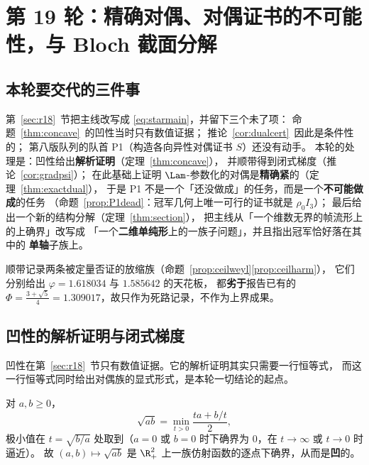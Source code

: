 \section{第 19 轮：精确对偶、对偶证书的不可能性，与 Bloch 截面分解}\label{sec:r19}

\subsection{本轮要交代的三件事}\label{sec:r19:motiv}

第~\ref{sec:r18}~节把主线改写成 \eqref{eq:starmain}，并留下三个未了项：
命题~\ref{thm:concave}~的凹性当时只有数值证据；
推论~\ref{cor:dualcert}~因此是条件性的；
第八版队列的队首 P1（构造各向异性对偶证书 $S$）还没有动手。
本轮的处理是：凹性给出\textbf{解析证明}（定理~\ref{thm:concave}），
并顺带得到闭式梯度（推论~\ref{cor:gradpsi}）；
在此基础上证明 $\Lam$-参数化的对偶是\textbf{精确紧}的（定理~\ref{thm:exactdual}），
于是 P1 不是一个「还没做成」的任务，而是一个\textbf{不可能做成}的任务
（命题~\ref{prop:P1dead}：冠军几何上唯一可行的证书就是 $\rho_0I_3$）；
最后给出一个新的结构分解（定理~\ref{thm:section}），
把主线从「一个维数无界的帧流形上的上确界」改写成
「一个\textbf{二维单纯形}上的一族子问题」，并且指出冠军恰好落在其中的
\textbf{单轴}子族上。

顺带记录两条被定量否证的放缩族（命题~\ref{prop:ceilweyl}\ref{prop:ceilharm}），
它们分别给出 $\varphi=1.618034$ 与 $1.585642$ 的天花板，
都\textbf{劣于}报告已有的 $\Phi=\frac{3+\sqrt5}4=1.309017$，故只作为死路记录，不作为上界成果。

\subsection{凹性的解析证明与闭式梯度}\label{sec:r19:conc}

凹性在第~\ref{sec:r18}~节只有数值证据。它的解析证明其实只需要一行恒等式，
而这一行恒等式同时给出对偶族的显式形式，是本轮一切结论的起点。

\begin{lemma}[几何平均的仿射下确界表示]\label{lem:geo}
对 $a,b\ge0$，
\begin{equation}\label{eq:geoam}
\sqrt{ab}=\min_{t>0}\frac{ta+b/t}{2},
\end{equation}
极小值在 $t=\sqrt{b/a}$ 处取到（$a=0$ 或 $b=0$ 时下确界为 $0$，在 $t\to\infty$ 或 $t\to0$ 时逼近）。
故 $(a,b)\mapsto\sqrt{ab}$ 是 $\R_+^2$ 上一族仿射函数的逐点下确界，从而是\textbf{凹}的。
\end{lemma}

